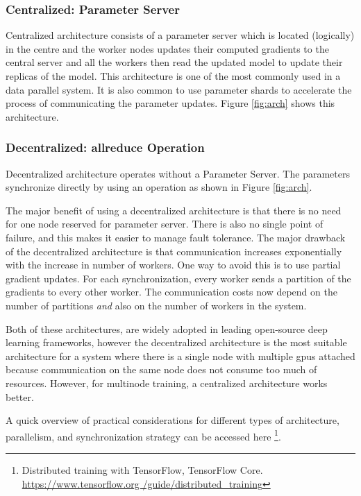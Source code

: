 \subsubsection{Centralized: Parameter Server}
Centralized architecture consists of a parameter server which is located (logically) in the centre and the worker nodes updates their computed gradients to the central server and all the workers then read the updated model to update their replicas of the model. This architecture is one of the most commonly used in a data parallel system. It is also common to use parameter shards to accelerate the process of communicating the parameter updates. Figure \ref{fig:arch} shows this architecture.

\subsubsection{Decentralized: allreduce Operation}
Decentralized architecture operates without a Parameter Server. The parameters synchronize directly by using an  operation as shown in Figure \ref{fig:arch}. 

The major benefit of using a decentralized architecture is that there is no need for one node reserved for parameter server. There is also no single point of failure, and this makes it easier to manage fault tolerance. The major drawback of the decentralized architecture is that communication increases exponentially with the increase in number of workers. One way to avoid this is to use partial gradient updates. For each synchronization, every worker sends a partition of the gradients to every other worker. The communication costs now depend on the number of partitions \emph{and} also on the number of workers in the system. 

Both of these architectures, are widely adopted in leading open-source deep learning frameworks, however the decentralized architecture is the most suitable architecture for a system where there is a single node with multiple \acrshort{gpu}s attached because communication on the same node does not consume too much of resources. However, for multinode training, a centralized architecture works better\cite{Mayer2020ScalableInfrastructures}. 

A quick overview of practical considerations for different types of architecture, parallelism, and synchronization strategy can be accessed here \footnote{Distributed training with TensorFlow, TensorFlow Core. \href{https://www.tensorflow.org/guide/distributed\_training}{https://www.tensorflow.org /guide/distributed\_training} }. 

